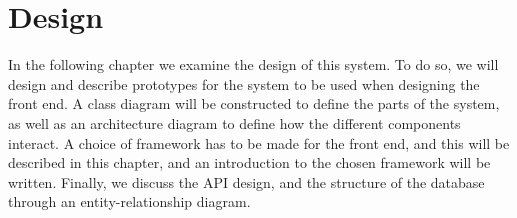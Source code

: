\chapter{Design}
In the following chapter we examine the design of this system.
To do so, we will design and describe prototypes for the system to be used when designing the front end.
A class diagram will be constructed to define the parts of the system, as well as an architecture diagram to define how the different components interact.
A choice of framework has to be made for the front end, and this will be described in this chapter, and an introduction to the chosen framework will be written.
Finally, we discuss the API design, and the structure of the database through an entity-relationship diagram.









